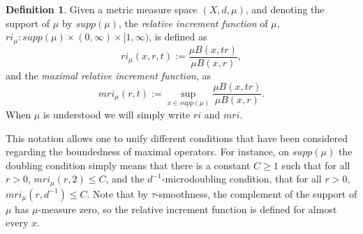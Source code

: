 \documentclass[12pt]{amsart}
\theoremstyle{definition}
\newtheorem{definition}[theorem]{Definition}
\theoremstyle{parrafo}
\begin{document}
\begin{definition} Given a metric measure space $(X, d, \mu)$, and denoting the support of $\mu$ by 
$supp(\mu)$,
the {\em relative increment function} of $\mu$, $ri_{\mu}: supp(\mu)\times (0,\infty)\times [1,\infty)$,
is defined as
\begin{equation} \label{ri}
ri_{\mu}(x, r, t) := \frac{\mu B(x, tr)}{\mu B(x, r)},
\end{equation}
and the {\em maximal relative increment function}, as
\begin{equation} \label{mri}
mri_{\mu}(r, t) := \sup_{x \in supp(\mu)}\frac{\mu B(x, tr)}{\mu B(x, r)}.
\end{equation}
When $\mu$ is understood we will simply write $ri$ and $mri$.
\end{definition}

This notation allows one to unify different conditions that have been considered regarding
the boundedness of maximal operators. For instance, on $supp(\mu)$ 
the doubling condition simply
means that there is a constant $C\ge 1$ such that for all $r > 0$, $mri_{\mu}(r, 2) \le C$, and
the $d^{-1}$-microdoubling condition,
that for all $r > 0$, $mri_{\mu}(r, d^{-1}) \le C$. Note that by $\tau$-smoothness, the complement of
the support of $\mu$ has $\mu$-measure zero, so the relative increment function is defined
for almost every $x$. 
\end{document}
